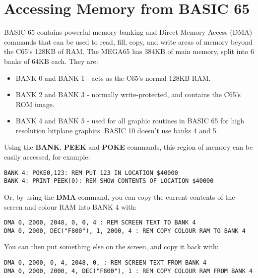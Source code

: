 \section{Accessing Memory from BASIC 65}

BASIC 65 contains powerful memory banking and Direct Memory Access (DMA) commands that can be used to read,
fill, copy, and write areas of memory beyond the C65's 128KB of RAM.  The MEGA65 has 384KB of main memory, split into 6
banks of 64KB each. They are:
\begin{itemize}
 \item BANK 0 and BANK 1 - acts as the C65's normal 128KB RAM.
 \item BANK 2 and BANK 3 - normally write-protected, and contains the C65's ROM image.
 \item BANK 4 and BANK 5 - used for all graphic routines in BASIC 65 for high resolution bitplane graphics.
       BASIC 10 doesn't use banks 4 and 5.
\end{itemize}

Using the {\bf BANK}, {\bf PEEK} and {\bf POKE} commands, this region of memory can be easily accessed, for example:

\begin{tcolorbox}[colback=black,coltext=white]
\verbatimfont{\codefont}
\begin{verbatim}
BANK 4: POKE0,123: REM PUT 123 IN LOCATION $40000
BANK 4: PRINT PEEK(0): REM SHOW CONTENTS OF LOCATION $40000
\end{verbatim}
\end{tcolorbox}

Or, by using the {\bf DMA} command, you can copy the current contents of the screen and colour RAM into BANK 4 with:

\begin{tcolorbox}[colback=black,coltext=white]
\verbatimfont{\codefont}
\begin{verbatim}
DMA 0, 2000, 2048, 0, 0, 4 : REM SCREEN TEXT TO BANK 4
DMA 0, 2000, DEC("F800"), 1, 2000, 4 : REM COPY COLOUR RAM TO BANK 4
\end{verbatim}
\end{tcolorbox}

You can then put something else on the screen, and copy it back with:

\begin{tcolorbox}[colback=black,coltext=white]
\verbatimfont{\codefont}
\begin{verbatim}
DMA 0, 2000, 0, 4, 2048, 0, : REM SCREEN TEXT FROM BANK 4
DMA 0, 2000, 2000, 4, DEC("F800"), 1 : REM COPY COLOUR RAM FROM BANK 4
\end{verbatim}
\end{tcolorbox}

